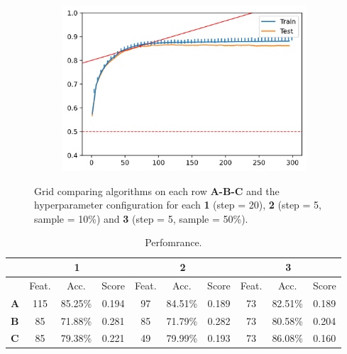 \begin{figure}[H]
\begin{subfigure}[b]{0.32\linewidth}
    \end{subfigure}
    \begin{subfigure}[b]{0.32\linewidth}
        \includegraphics[width=\linewidth]{img/ch5/sampling/300-s5-p05.png}
    \end{subfigure}
    \caption{Grid comparing algorithms on each row \textbf{A-B-C} and the hyperparameter configuration for each \textbf{1} (step = 20), \textbf{2} (step = 5, sample = 10\%) and \textbf{3} (step = 5, sample = 50\%).}
    \label{fig:ch5.sampling.vanilla.comp}
\end{figure}

\begin{table}[h]
    \centering
    \begin{tabular}{l | c c c|c c c|c c c}
        \toprule
        \multicolumn{1}{c}{} & \multicolumn{3}{c}{\textbf{1}} & \multicolumn{3}{c}{\textbf{2}} & \multicolumn{3}{c}{\textbf{3}}\\
        \midrule
        &Feat.&Acc.&Score&Feat.&Acc.&Score&Feat.&Acc.&Score \\
        \midrule
        \textbf{A}&      115 & 85.25\% & 0.194 &      97 & 84.51\% & 0.189 &     73 & 82.51\% & 0.189\\
        \textbf{B}&      85 & 71.88\% & 0.281 &       85 & 71.79\% & 0.282 &     73 & 80.58\% & 0.204\\
        \textbf{C}&      85 & 79.38\% & 0.221 &       49 & 79.99\% & 0.193 &     73 & 86.08\% & 0.160\\
        \bottomrule
        \end{tabular}
    \caption{Perfomrance.}
\end{table}


